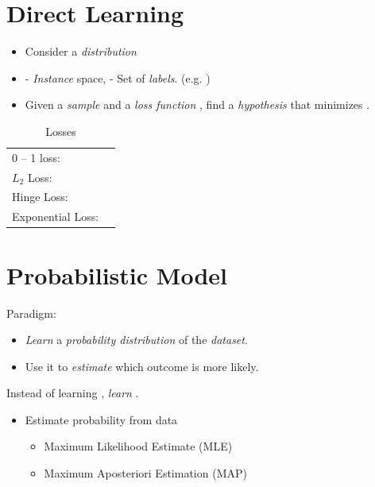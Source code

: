 \documentclass[
	number={3},
	title={Na\"iive Bayes Learning}
]{cs584notes}
\begin{document}
\section{Direct Learning}\label{sec:direct-learning}
\begin{itemize}
	\item Consider a \emph{distribution} 
	\item {} - \emph{Instance} space,  - Set of \emph{labels}. (e.g. )
	\item Given a \emph{sample}  and a \emph{loss function} , find a \emph{hypothesis}  that minimizes .
\end{itemize}

\begin{table}[H]
	\centering
	\caption{Losses}
	\label{tab:losses}
	\begin{tabular}{l l}
		0 -- 1 loss: & \data{$L(h(\vec{x}), y) = 1, h(\vec{x}) \neq y$ otherwise $L(h(\vec{x}), y) = 0$}\\
		$L_{2}$ Loss: & \data{$L(h(\vec{x}), y) = \left( h(\vec{x}) - y \right)^{2}$}\\
		Hinge Loss: & \data{$L(h(\vec{x}), y) = \max\{ 0, 1 - yh(\vec{x}) \}$}\\
		Exponential Loss: & \data{$L(h(\vec{x}), y) = e^{-yh(\vec{x})} $}\\
	\end{tabular}
\end{table}

\section{Probabilistic Model}\label{sec:probabilistic-model}
Paradigm:
\begin{itemize}
	\item \emph{Learn} a \emph{probability distribution} of the \emph{dataset}.
	\item Use it to \emph{estimate} which outcome is more likely.
\end{itemize}

Instead of learning , \emph{learn} .

\begin{itemize}
	\item Estimate probability from data
	\begin{itemize}
		\item Maximum Likelihood Estimate (MLE)
		\item Maximum Aposteriori Estimation (MAP)
	\end{itemize}
\end{itemize}
\end{document}
